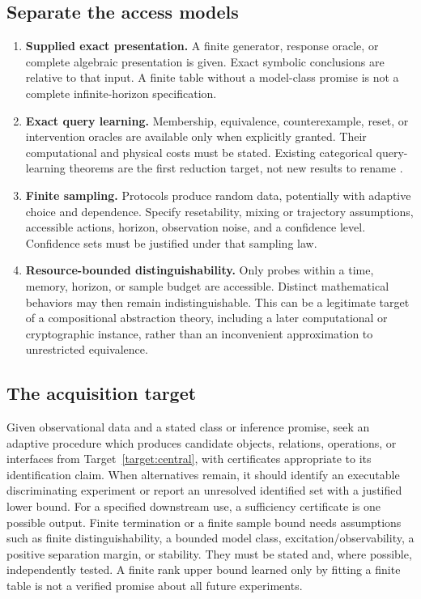 \documentclass[11pt]{article}
\theoremstyle{remark}
\begin{document}
\subsection{Separate the access models}

\begin{enumerate}
\item \textbf{Supplied exact presentation.} A finite generator, response oracle, or complete algebraic presentation is given. Exact symbolic conclusions are relative to that input. A finite table without a model-class promise is not a complete infinite-horizon specification.
\item \textbf{Exact query learning.} Membership, equivalence, counterexample, reset, or intervention oracles are available only when explicitly granted. Their computational and physical costs must be stated. Existing categorical query-learning theorems are the first reduction target, not new results to rename \cite{CALF,FunctorialLearning}.
\item \textbf{Finite sampling.} Protocols produce random data, potentially with adaptive choice and dependence. Specify resetability, mixing or trajectory assumptions, accessible actions, horizon, observation noise, and a confidence level. Confidence sets must be justified under that sampling law.
\item \textbf{Resource-bounded distinguishability.} Only probes within a time, memory, horizon, or sample budget are accessible. Distinct mathematical behaviors may then remain indistinguishable. This can be a legitimate target of a compositional abstraction theory, including a later computational or cryptographic instance, rather than an inconvenient approximation to unrestricted equivalence.
\end{enumerate}

\subsection{The acquisition target}

Given observational data and a stated class or inference promise, seek an adaptive procedure which produces candidate objects, relations, operations, or interfaces from Target~\ref{target:central}, with certificates appropriate to its identification claim. When alternatives remain, it should identify an executable discriminating experiment or report an unresolved identified set with a justified lower bound. For a specified downstream use, a sufficiency certificate is one possible output. Finite termination or a finite sample bound needs assumptions such as finite distinguishability, a bounded model class, excitation/observability, a positive separation margin, or stability. They must be stated and, where possible, independently tested. A finite rank upper bound learned only by fitting a finite table is not a verified promise about all future experiments.
\end{document}
